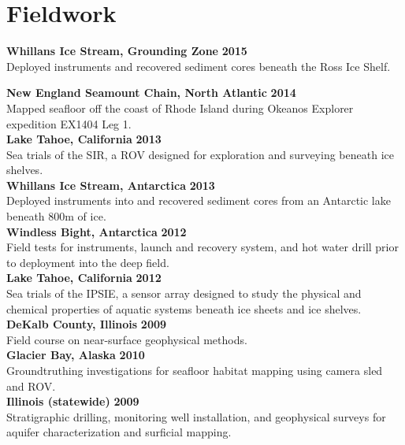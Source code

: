 \section{Fieldwork} 
\textbf{Whillans Ice Stream, Grounding Zone} \hfill \textbf{2015}\\
Deployed instruments and recovered sediment cores beneath the Ross Ice Shelf.

\textbf{New England Seamount Chain, North Atlantic} \hfill \textbf{2014}\\
Mapped seafloor off the coast of Rhode Island during Okeanos Explorer expedition EX1404 Leg 1. \\

\textbf{Lake Tahoe, California} \hfill \textbf{2013}\\
Sea trials of the SIR, a ROV designed for exploration and surveying beneath ice shelves.\\

\textbf{Whillans Ice Stream, Antarctica} \hfill \textbf{2013}\\
Deployed instruments into and recovered sediment cores from an Antarctic lake beneath 800m of ice.\\

\textbf{Windless Bight, Antarctica} \hfill \textbf{2012}\\
Field tests for instruments, launch and recovery system, and hot water drill prior to deployment into the deep field.\\

 \textbf{Lake Tahoe, California} \hfill \textbf{2012}\\
Sea trials of the IPSIE, a sensor array designed to study the physical and chemical properties of aquatic systems beneath ice sheets and ice shelves.\\

\textbf{DeKalb County, Illinois} \hfill \textbf{2009}\\
Field course on near-surface geophysical methods.\\

\textbf{Glacier Bay, Alaska} \hfill \textbf{2010}\\
Groundtruthing investigations for seafloor habitat mapping using camera sled and ROV.\\

\textbf{Illinois (statewide)} \hfill \textbf{2009}\\
Stratigraphic drilling, monitoring well installation, and geophysical surveys for aquifer characterization and surficial mapping. \\
